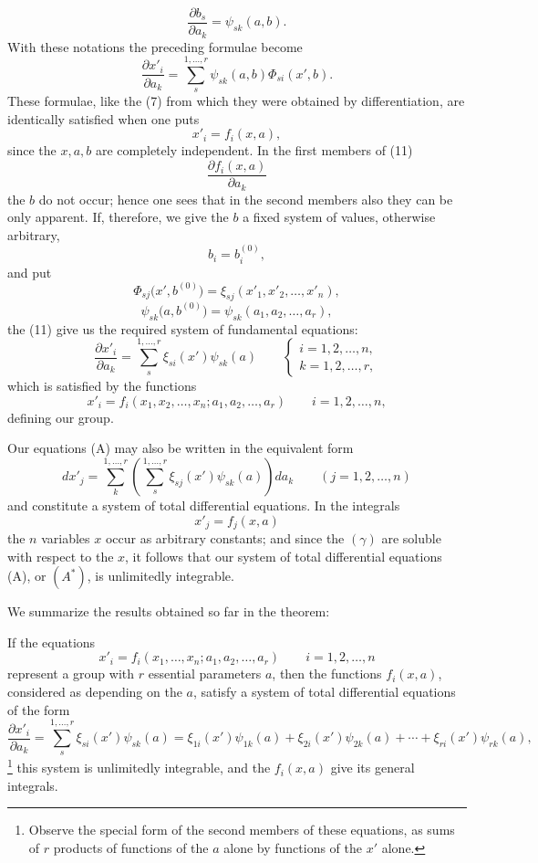 \documentclass[11pt]{book}
\begin{document}
\[
 \frac{\partial b_s}{\partial a_k}=\psi_{sk}(a,b).
\]
With these notations the preceding formulae become
\begin{equation*}\tag{11}
 \frac{\partial x'_i}{\partial a_k}
 =\sum\limits_s^{1,\ldots,r}\psi_{sk}(a,b)\Phi_{si}(x',b).
\end{equation*}
These formulae, like the (7) from which they were obtained by differentiation, are identically satisfied when one puts
\[
 x'_i=f_i(x,a),
\]
since the $x,a,b$ are completely independent. In the first members of (11)
\[
 \frac{\partial f_i(x,a)}{\partial a_k}
\]
the $b$ do not occur; hence one sees that in the second members also they can be only apparent. If, therefore, we give the $b$ a fixed system of values, otherwise arbitrary,
\[
 b_i=b_i^{(0)},
\]
and put
\[
 \Phi_{sj}\bigl(x',b^{(0)}\bigr)=\xi_{sj}(x'_1,x'_2,\ldots,x'_n),
\]
\[
 \psi_{sk}\bigl(a,b^{(0)}\bigr)=\psi_{sk}(a_1,a_2,\ldots,a_r),
\]
the (11) give us the required system of fundamental equations:
\begin{equation*}\tag{A}
 \frac{\partial x'_i}{\partial a_k}
 =\sum\limits_s^{1,\ldots,r}\xi_{si}(x')\psi_{sk}(a)
 \qquad
 \begin{cases}
 i=1,2,\ldots,n,\\
 k=1,2,\ldots,r,
 \end{cases}
\end{equation*}
which is satisfied by the functions
\[
 x'_i=f_i(x_1,x_2,\ldots,x_n;a_1,a_2,\ldots,a_r)
 \qquad i=1,2,\ldots,n,
\]
defining our group.

Our equations (A) may also be written in the equivalent form
\begin{equation*}\tag{$A^*$}
 dx'_j=\sum\limits_k^{1,\ldots,r}\left(\sum\limits_s^{1,\ldots,r}\xi_{sj}(x')\psi_{sk}(a)\right)da_k
 \qquad (j=1,2,\ldots,n)
\end{equation*}
and constitute a system of total differential equations. In the integrals
\begin{equation*}\tag{$\gamma$}
 x'_j=f_j(x,a)
\end{equation*}
the $n$ variables $x$ occur as arbitrary constants; and since the $(\gamma)$ are soluble with respect to the $x$, it follows that our system of total differential equations (A), or $(A^*)$, is unlimitedly integrable.

We summarize the results obtained so far in the theorem:

If the equations
\[
 x'_i=f_i(x_1,\ldots,x_n; a_1,a_2,\ldots,a_r)
 \qquad i=1,2,\ldots,n
\]
represent a group with $r$ essential parameters $a$, then the functions $f_i(x,a)$, considered as depending on the $a$, satisfy a system of total differential equations of the form
\begin{equation*}\tag{A}
 \frac{\partial x'_i}{\partial a_k}
 =\sum\limits_s^{1,\ldots,r}\xi_{si}(x')\psi_{sk}(a)
 =\xi_{1i}(x')\psi_{1k}(a)+\xi_{2i}(x')\psi_{2k}(a)+\cdots+\xi_{ri}(x')\psi_{rk}(a),
\end{equation*}
\footnote{Observe the special form of the second members of these equations, as sums of $r$ products of functions of the $a$ alone by functions of the $x'$ alone.}
this system is unlimitedly integrable, and the $f_i(x,a)$ give its general integrals.
\end{document}
